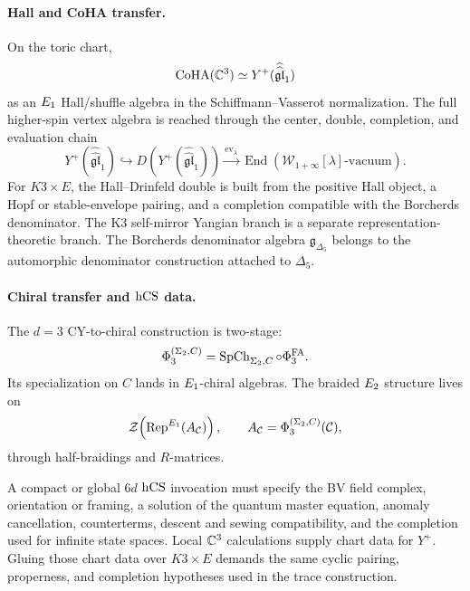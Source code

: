 \paragraph{Hall and CoHA transfer.}
On the toric chart,
\[
  \operatorname{CoHA}(\mathbb{C}^3)\simeq
  Y^+(\widehat{\widehat{\mathfrak{gl}}}_1)
\]
as an \(E_1\) Hall/shuffle algebra in the Schiffmann--Vasserot
normalization.  The full higher-spin vertex algebra is reached through
the center, double, completion, and evaluation chain
\[
  Y^+(\widehat{\widehat{\mathfrak{gl}}}_1)
  \hookrightarrow D(Y^+(\widehat{\widehat{\mathfrak{gl}}}_1))
  \xrightarrow{\mathrm{ev}_\lambda}
  \operatorname{End}(\mathcal W_{1+\infty}[\lambda]\text{-vacuum}).
\]
For \(K3\times E\), the Hall--Drinfeld double is built from the
positive Hall object, a Hopf or stable-envelope pairing, and a
completion compatible with the Borcherds denominator.  The K3
self-mirror Yangian branch is a separate representation-theoretic
branch.  The Borcherds denominator algebra \(\mathfrak g_{\Delta_5}\)
belongs to the automorphic denominator construction attached to
\(\Delta_5\).

\paragraph{Chiral transfer and \(\mathrm{hCS}\) data.}
The \(d=3\) CY-to-chiral construction is two-stage:
\[
  \Phi_3^{(\Sigma_2,C)}
  =
  \operatorname{SpCh}_{\Sigma_2,C}\circ\Phi^{\mathrm{FA}}_3.
\]
Its specialization on \(C\) lands in \(E_1\)-chiral algebras.  The
braided \(E_2\) structure lives on
\[
  \mathcal{Z}\!\left(\operatorname{Rep}^{E_1}(A_{\mathcal C})\right),
  \qquad A_{\mathcal C}=\Phi_3^{(\Sigma_2,C)}(\mathcal C),
\]
through half-braidings and \(R\)-matrices.

A compact or global \(6d\) \(\mathrm{hCS}\) invocation must specify the BV field
complex, orientation or framing, a solution of the quantum master
equation, anomaly cancellation, counterterms, descent and sewing
compatibility, and the completion used for infinite state spaces.  Local
\(\mathbb{C}^3\) calculations supply chart data for \(Y^+\).  Gluing those chart
data over \(K3\times E\) demands the same cyclic pairing, properness,
and completion hypotheses used in the trace construction.

